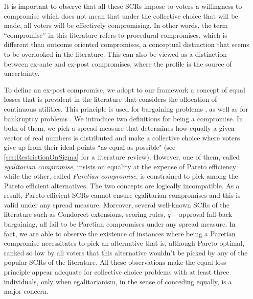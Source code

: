 \documentclass[version=3.21, pagesize, twoside=off, bibliography=totoc, DIV=calc, fontsize=12pt, a4paper]{scrartcl}
\begin{document}
It is important to observe that all these \acp{SCR} impose to voters a willingness to compromise which does not mean that under the collective choice that will be made, all voters will be effectively compromising. In other words, the term “compromise” in this literature refers to procedural compromises, which is different than outcome oriented compromises, a conceptual distinction that seems to be overlooked in the literature.
This can also be viewed as a distinction between ex-ante and ex-post compromises, where the profile is the source of uncertainty.

To define an ex-post compromise, we adopt to our framework a concept of equal losses that is prevalent in the literature that considers the allocation of continuous utilities. This principle is used for bargaining problems \citep{Chun1988}, \citep{Chun1991} as well as for bankruptcy problems \citep{Herrero2001}. 
We introduce two definitions for being a compromise. In both of them, we pick a spread measure that determines how equally a given vector of real numbers is distributed and make a collective choice where voters give up from their ideal points “as equal as possible" (see \cref{sec:RestrictionOnSigma} for a literature review). However, one of them, called \textit{egalitarian compromise}, insists on equality at the expense of Pareto efficiency while the other, called \textit{Paretian compromise}, is constrained to pick among the Pareto efficient alternatives. 
The two concepts are logically incompatible. As a result, Pareto efficient \acp{SCR} cannot ensure egalitarian compromises and this is valid under any spread measure. Moreover, several well-known \acp{SCR} of the literature such as Condorcet extensions, scoring rules, $q-$approval fall-back bargaining, all fail to be Paretian compromises under any spread measure. In fact, we are able to observe the existence of instances where being a Paretian compromise necessitates to pick an alternative that is, although Pareto optimal, ranked so low by all voters that this alternative wouldn't be picked by any of the popular \acp{SCR} of the literature. All these observations make the equal-loss principle appear adequate for collective choice problems with at least three individuals, only when egalitarianism, in the sense of conceding equally, is a major concern.
\end{document}
